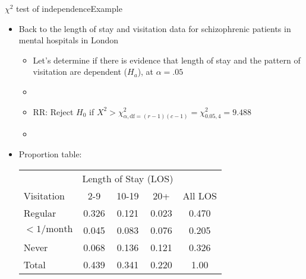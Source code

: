 \documentclass[xcolor=dvipsnames]{beamer}
\begin{document}
\begin{frame}{$\chi^2$ test of independence}{Example}
	\begin{itemize}
		\item Back to the length of stay and visitation data for schizophrenic patients in mental hospitals in London  \pause
		\begin{itemize}
			\item Let's determine if there is evidence that length of stay and the pattern of visitation are dependent ($H_a$), at $\alpha = .05$  \pause
			\item[]
			\item RR: Reject $H_0$ if $X^2 > \chi^2_{\alpha,\text{df}=(r-1)(c-1)}=\chi^2_{0.05,4}= 9.488$  \pause
			\item[]
		\end{itemize}
		\item Proportion table:  \pause
		\begin{center}
			\begin{tabular}{|l|ccc|c|}
				\hline
				& \multicolumn{3}{c|}{Length of Stay (LOS)} & \\
				Visitation & 2-9 & 10-19 & 20+ & All LOS \\ \hline
				Regular & 0.326 & 0.121 & 0.023 & 0.470\\ 
				$<1/\text{month}$ & 0.045 & 0.083 & 0.076 & 0.205 \\
				Never & 0.068 & 0.136 & 0.121 & 0.326\\ \hline
				Total & 0.439 & 0.341 & 0.220 & 1.00\\ \hline
			\end{tabular}
		\end{center}
	\end{itemize}
\end{frame}
\end{document}
